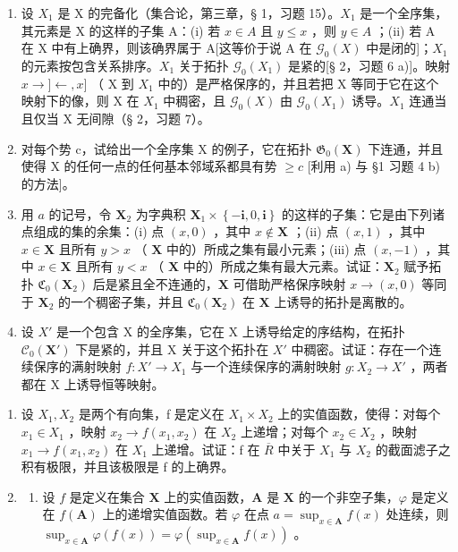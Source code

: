 \begin{enumerate}
\def\labelenumi{\alph{enumi})}
\item
设 \(X_{1}\) 是 X 的完备化（集合论，第三章，§ 1，习题 15）。\(X_{1}\) 是一个全序集，其元素是 X 的这样的子集 A：(i) 若 \(x \in A\) 且 \(y \leqslant x\) ，则 \(y \in A\) ；(ii) 若 A 在 X 中有上确界，则该确界属于 A{[}这等价于说 A 在 \(\mathcal{G}_{0}(X)\) 中是闭的{]}；\(X_{1}\) 的元素按包含关系排序。\(X_{1}\) 关于拓扑 \(\mathcal{G}_{0}(X_{1})\) 是紧的{[}§ 2，习题 6 a){]}。映射 \(x \to ]\leftarrow,x]\) （ X 到 \(X_{1}\) 中的）是严格保序的，并且若把 X 等同于它在这个映射下的像，则 X 在 \(X_{1}\) 中稠密，且 \(\mathcal{G}_{0}(X)\) 由 \(\mathcal{G}_{0}(X_{1})\) 诱导。\(X_{1}\) 连通当且仅当 X 无间隙（§ 2，习题 7）。
\item
对每个势 c，试给出一个全序集 X 的例子，它在拓扑 \(\mathfrak{G}_{0}(\mathbf{X})\) 下连通，并且使得 X 的任何一点的任何基本邻域系都具有势 \(\geqslant c\) {[}利用 a) 与 §1 习题 4 b) 的方法{]}。
\item
用 \(a\) 的记号，令 \(\mathbf{X}_{2}\) 为字典积 \(\mathbf{X}_{1} \times \left\{-\mathbf{i}, 0, \mathbf{i}\right\}\) 的这样的子集：它是由下列诸点组成的集的余集：(i) 点 \((x, 0)\) ，其中 \(x \notin \mathbf{X}\) ；(ii) 点 \((x, 1)\) ，其中 \(x \in \mathbf{X}\) 且所有 \(y > x\) （ \(\mathbf{X}\) 中的）所成之集有最小元素；(iii) 点 \((x, -1)\) ，其中 \(x \in \mathbf{X}\) 且所有 \(y < x\) （ \(\mathbf{X}\) 中的）所成之集有最大元素。试证：\(\mathbf{X}_{2}\) 赋予拓扑 \(\mathfrak{C}_{0}(\mathbf{X}_{2})\) 后是紧且全不连通的，\(\mathbf{X}\) 可借助严格保序映射 \(x \to (x, 0)\) 等同于 \(\mathbf{X}_{2}\) 的一个稠密子集，并且 \(\mathfrak{C}_{0}(\mathbf{X}_{2})\) 在 \(\mathbf{X}\) 上诱导的拓扑是离散的。
\item
设 \(X'\) 是一个包含 X 的全序集，它在 X 上诱导给定的序结构，在拓扑 \(\mathcal{C}_{0}(\mathbf{X}')\) 下是紧的，并且 X 关于这个拓扑在 \(X'\) 中稠密。试证：存在一个连续保序的满射映射 \(f: X' \to X_{1}\) 与一个连续保序的满射映射 \(g: X_{2} \to X'\) ，两者都在 X 上诱导恒等映射。
\end{enumerate}

\BourbakiExerciseGroup

\begin{enumerate}
\def\labelenumi{\arabic{enumi})}
\item
设 \(X_{1}, X_{2}\) 是两个有向集，f 是定义在 \(X_{1} \times X_{2}\) 上的实值函数，使得：对每个 \(x_{1} \in X_{1}\) ，映射 \(x_{2} \to f(x_{1}, x_{2})\) 在 \(X_{2}\) 上递增；对每个 \(x_{2} \in X_{2}\) ，映射 \(x_{1} \rightarrow f(x_{1}, x_{2})\) 在 \(X_{1}\) 上递增。试证：f 在 \(\overline{R}\) 中关于 \(X_{1}\) 与 \(X_{2}\) 的截面滤子之积有极限，并且该极限是 f 的上确界。
\item
  \begin{enumerate}
  \def\labelenumii{\alph{enumii})}
  \tightlist
  \item
设 \(f\) 是定义在集合 \(\mathbf{X}\) 上的实值函数，\(\mathbf{A}\) 是 \(\mathbf{X}\) 的一个非空子集，\(\varphi\) 是定义在 \(f(\mathbf{A})\) 上的递增实值函数。若 \(\varphi\) 在点 \(a = \sup_{x \in \mathbf{A}} f(x)\) 处连续，则 \(\sup_{x \in \mathbf{A}} \varphi(f(x)) = \varphi(\sup_{x \in \mathbf{A}} f(x))\) 。
  \end{enumerate}
\end{enumerate}

